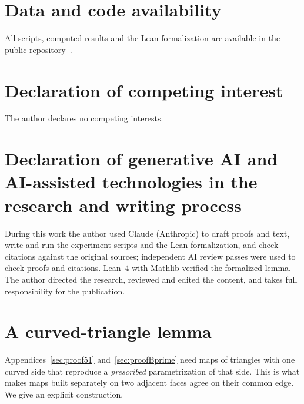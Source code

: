 \documentclass[preprint,12pt]{elsarticle}
\theoremstyle{definition}
\theoremstyle{remark}
\begin{document}
\section*{Data and code availability}
All scripts, computed results and the Lean formalization are available in the public repository~\cite{repo}.

\section*{Declaration of competing interest}
The author declares no competing interests.

\section*{Declaration of generative AI and AI-assisted technologies in the research and writing process}
During this work the author used Claude (Anthropic) to draft proofs and text, write and run the experiment scripts and
the Lean formalization, and check citations against the original sources; independent AI review passes were used to
check proofs and citations. Lean~4 with Mathlib verified the formalized lemma. The author directed the research,
reviewed and edited the content, and takes full responsibility for the publication.

\appendix
\section{A curved-triangle lemma}\label{sec:curvedtri}

Appendices~\ref{sec:proof51} and~\ref{sec:proofBprime} need maps of triangles with one curved side that reproduce a
\emph{prescribed} parametrization of that side. This is what makes maps built separately on two adjacent faces agree
on their common edge. We give an explicit construction.
\end{document}
